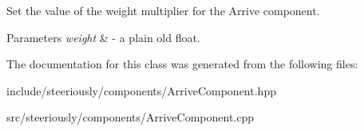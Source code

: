 Set the value of the weight multiplier for the Arrive component. 


\begin{DoxyParams}{Parameters}
{\em weight} & -\/ a plain old float. \\
\hline
\end{DoxyParams}


The documentation for this class was generated from the following files\-:\begin{DoxyCompactItemize}
\item 
include/steeriously/components/Arrive\-Component.\-hpp\item 
src/steeriously/components/Arrive\-Component.\-cpp\end{DoxyCompactItemize}
